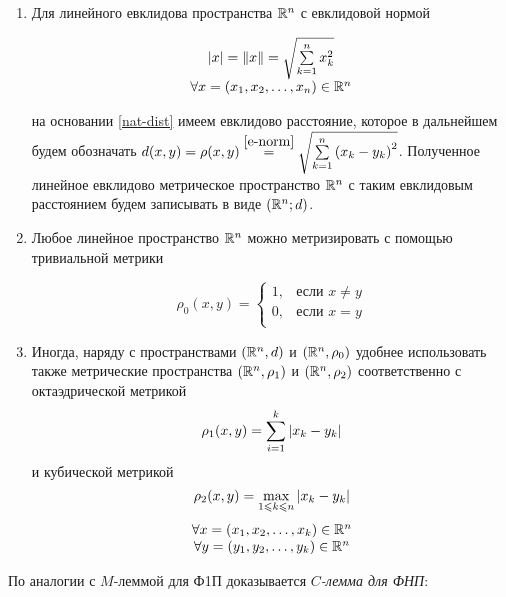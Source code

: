 \documentclass[../main.tex]{subfiles}
\begin{document}
\begin{rems} 

 \quad

 \begin{enumerate}
  \item  Для линейного евклидова пространства $\mathbb{R}^n$ с евклидовой
  нормой
  
  \begin{equation}
   \label{e-norm}
   \begin{array}{c}
    \left|{x}\right| = \lVert{x}\rVert = \sqrt{\sum\limits_{k=1}^n x_k^2} \\
    \forall x = (x_1, x_2, \dots, x_n) \in \mathbb{R}^n
   \end{array}
  \end{equation}
  
  на основании \eqref{nat-dist} имеем евклидово расстояние, которое
  в дальнейшем будем обозначать $d(x, y) = \rho(x, y) \stk{e-norm}{=}
  \sqrt{\sum\limits_{k=1}^n \left(x_k - y_k \right)^2 }$. 
  Полученное линейное евклидово метрическое пространство $\mathbb{R}^n$ 
  с таким евклидовым расстоянием будем записывать в виде $(\mathbb{R}^n; d)$.
  
  \item Любое линейное пространство $\mathbb{R}^n$ можно метризировать с
  помощью тривиальной метрики
  
  \[
   \rho_0(x, y) =
   \begin{cases}
    1, & \text{если } x \ne y \\
    0, & \text{если } x = y \\
   \end{cases}
  \]
  
  \item Иногда, наряду с пространствами $(\mathbb{R}^n, d)$ и $(\mathbb{R}^n, \rho_0)$
  удобнее использовать также метрические пространства $(\mathbb{R}^n, \rho_1)$
  и $(\mathbb{R}^n, \rho_2)$ соответственно с октаэдрической метрикой
  \[\rho_1(x, y) = \sum_{i=1}^k \left|{x_k - y_k}\right|\]
  и кубической метрикой
  \[\rho_2(x, y) = \max_{1 \leqslant k \leqslant n} \left|{x_k - y_k}\right|\]
  \[\begin{array}{c}
     \forall x = (x_1, x_2, \dots, x_k) \in \mathbb{R}^n \\
     \forall y = (y_1, y_2, \dots, y_k) \in \mathbb{R}^n \\
    \end{array}\]
 \end{enumerate}

\end{rems}

По аналогии с $M$-леммой для Ф1П доказывается \emph{$C$-лемма для ФНП}:
\end{document}
